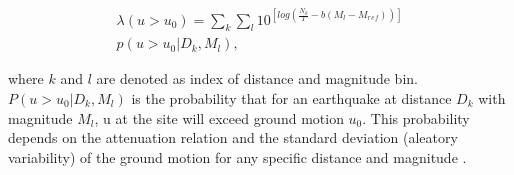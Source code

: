 \begin{equation}
\begin{split}
\lambda(u>u_{0}) = \sum_{k}\sum_{l}10^{[log(\frac{N_{k}}{T}-b(M_l-M{_r{_e{_f}}}))]} \\
p(u>u_0 | D_k ,M_l),
\end{split}
\end{equation}

\noindent
where $k$ and $l$ are denoted as index of distance and magnitude bin. $P(u>u_0 | D_k,M_l )$ is the probability that for an earthquake at distance $D_k$ with magnitude $M_l$, u at the site will exceed  ground motion $u_0$. This probability depends on the attenuation relation and the standard deviation (aleatory variability) of the ground motion for any specific distance and magnitude \citep{Frankel1995}.











